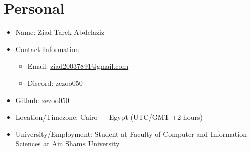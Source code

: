 \section{Personal}

\begin{itemize}
  \item Name: Ziad Tarek Abdelaziz
  \item Contact Information:
        \begin{itemize}
          \item Email: \href{mailto:ziad20037891@gmail.com}{ziad20037891@gmail.com}
          \item Discord: zezoo050
        \end{itemize}
  \item Github: \href{https://github.com/zezoo050}{zezoo050}
  \item Location/Timezone: Cairo --- Egypt (UTC/GMT +2 hours)
  \item University/Employment: Student at Faculty of Computer and Information Sciences
        at Ain Shams University
\end{itemize}
